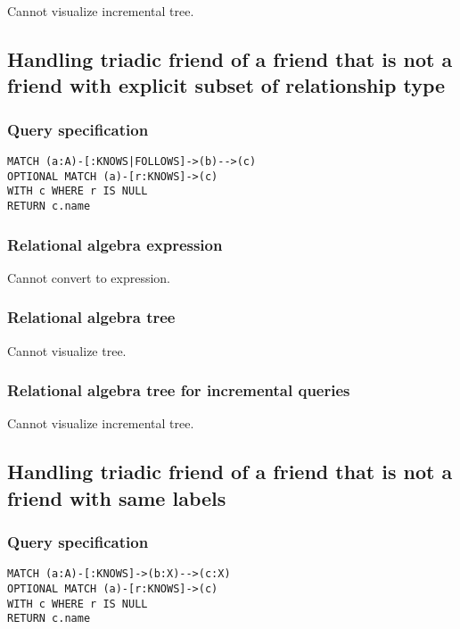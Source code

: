 Cannot visualize incremental tree.

\subsection{Handling triadic friend of a friend that is not a friend with explicit subset of relationship type}

\subsubsection*{Query specification}

\begin{lstlisting}
MATCH (a:A)-[:KNOWS|FOLLOWS]->(b)-->(c)
OPTIONAL MATCH (a)-[r:KNOWS]->(c)
WITH c WHERE r IS NULL
RETURN c.name
\end{lstlisting}

\subsubsection*{Relational algebra expression}

Cannot convert to expression.

\subsubsection*{Relational algebra tree}

Cannot visualize tree.

\subsubsection*{Relational algebra tree for incremental queries}

Cannot visualize incremental tree.

\subsection{Handling triadic friend of a friend that is not a friend with same labels}

\subsubsection*{Query specification}

\begin{lstlisting}
MATCH (a:A)-[:KNOWS]->(b:X)-->(c:X)
OPTIONAL MATCH (a)-[r:KNOWS]->(c)
WITH c WHERE r IS NULL
RETURN c.name
\end{lstlisting}

